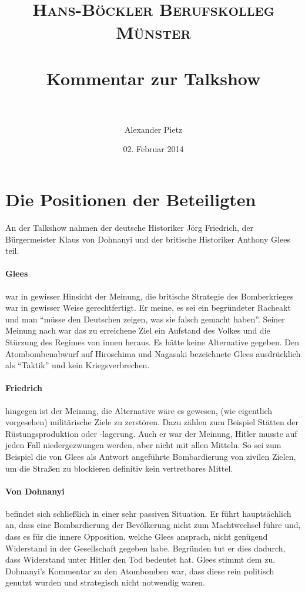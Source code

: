 \documentclass[paper=a4, fontsize=11pt]{article}
\title{	
\normalfont \normalsize 
\textsc{Hans-Böckler Berufskolleg Münster} \\ [25pt] 
\horrule{0.5pt} \\[0.4cm]
\huge Kommentar zur Talkshow\\ 
\horrule{2pt} \\[0.5cm] 
}
\author{Alexander Pietz}
\date{\normalsize 02. Februar 2014}
\begin{document}
\maketitle


\section{Die Positionen der Beteiligten}
An der Talkshow nahmen der deutsche Historiker Jörg Friedrich, der Bürgermeister Klaus von Dohnanyi und der britische Historiker Anthony Glees teil.

\paragraph{Glees} war in gewisser Hinsicht der Meinung, die britische Strategie des Bomberkrieges war in gewisser Weise gerechtfertigt. Er meine, es sei ein begründeter Racheakt und man ``müsse den Deutschen zeigen, was sie falsch gemacht haben''. Seiner Meinung nach war das zu erreichene Ziel ein Aufstand des Volkes und die Stürzung des Regimes von innen heraus. Es hätte keine Alternative gegeben.
Den Atombombenabwurf auf Hiroschima und Nagasaki bezeichnete Glees ausdrücklich als ``Taktik'' und kein Kriegsverbrechen.

\paragraph{Friedrich} hingegen ist der Meinung, die Alternative wäre es gewesen, (wie eigentlich vorgesehen) militärische Ziele zu zerstören. Dazu zählen zum Beispiel Stätten der Rüstungsproduktion oder -lagerung. Auch er war der Meinung, Hitler musste auf jeden Fall niedergezwungen werden, aber nicht mit allen Mitteln. So sei zum Beispiel die von Glees als Antwort angeführte Bombardierung von zivilen Zielen, um die Straßen zu blockieren definitiv kein vertretbares Mittel.

\paragraph{Von Dohnanyi} befindet sich schließlich in einer sehr passiven Situation. Er führt hauptsächlich an, dass eine Bombardierung der Bevölkerung nicht zum Machtwechsel führe und, dass es für die innere Opposition, welche Glees ansprach, nicht genügend Widerstand in der Gesellschaft gegeben habe. Begründen tut er dies dadurch, dass Widerstand unter Hitler den Tod bedeutet hat. Glees stimmt dem zu. Dohnanyi's Kommentar zu den Atombomben war, dass diese rein politisch genutzt wurden und strategisch nicht notwendig waren.
\end{document}
